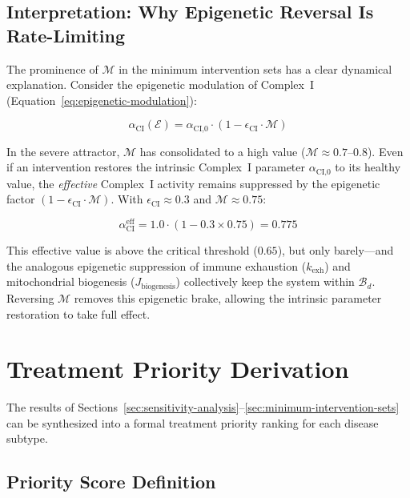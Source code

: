 \subsection{Interpretation: Why Epigenetic Reversal Is Rate-Limiting}

The prominence of $\mathcal{M}$ in the minimum intervention sets has a clear dynamical explanation. Consider the epigenetic modulation of Complex~I (Equation~\ref{eq:epigenetic-modulation}):

\begin{equation}
\alpha_{\text{CI}}(\mathcal{E}) = \alpha_{\text{CI,0}} \cdot (1 - \epsilon_{\text{CI}} \cdot \mathcal{M})
\end{equation}

In the severe attractor, $\mathcal{M}$ has consolidated to a high value ($\mathcal{M} \approx 0.7$--$0.8$). Even if an intervention restores the intrinsic Complex~I parameter $\alpha_{\text{CI,0}}$ to its healthy value, the \emph{effective} Complex~I activity remains suppressed by the epigenetic factor $(1 - \epsilon_{\text{CI}} \cdot \mathcal{M})$. With $\epsilon_{\text{CI}} \approx 0.3$ and $\mathcal{M} \approx 0.75$:

\begin{equation}
\alpha_{\text{CI}}^{\text{eff}} = 1.0 \cdot (1 - 0.3 \times 0.75) = 0.775
\end{equation}

This effective value is above the critical threshold ($0.65$), but only barely---and the analogous epigenetic suppression of immune exhaustion ($k_{\text{exh}}$) and mitochondrial biogenesis ($J_{\text{biogenesis}}$) collectively keep the system within $\mathcal{B}_d$. Reversing $\mathcal{M}$ removes this epigenetic brake, allowing the intrinsic parameter restoration to take full effect.

\section{Treatment Priority Derivation}
\label{sec:treatment-priority-formal}

The results of Sections~\ref{sec:sensitivity-analysis}--\ref{sec:minimum-intervention-sets} can be synthesized into a formal treatment priority ranking for each disease subtype.

\subsection{Priority Score Definition}

